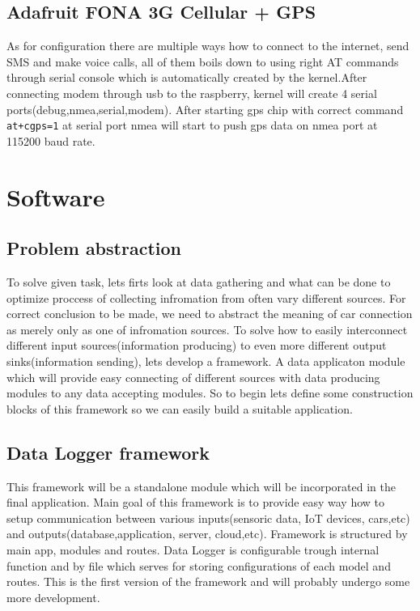 \subsection{Adafruit FONA 3G Cellular + GPS} %
\label{sub:adafruit_fona_3g_cellular_gps_}
 As for configuration there are multiple ways how to connect to the internet, send SMS and make voice calls, all of them boils down to using right AT commands through serial console which is automatically created by the kernel.After connecting modem through usb to the raspberry, kernel will create 4 serial ports(debug,nmea,serial,modem). After starting gps chip with correct command \verb|at+cgps=1| at serial port nmea will start to push gps data on nmea port at 115200 baud rate.
\newpage
\section{Software} %
\label{sec:software}
\subsection{Problem abstraction} %
\label{sub:problem_abstraction}
To solve given task, lets firts look at data gathering and what can be done to optimize proccess of collecting infromation from often vary different sources. For correct conclusion to be made, we need to abstract the meaning of car connection as merely only as one of infromation sources. To solve how to easily interconnect different input sources(information producing) to even more different output sinks(information sending), lets develop a framework. A data applicaton module which will provide easy connecting of different sources with data producing modules to any data accepting modules. So to begin lets define some construction blocks of this framework so we can easily build a suitable application.
\subsection{Data Logger framework} %
This framework will be a standalone module which will be incorporated in the final application. Main goal of this framework is to provide easy way how to setup communication between various inputs(sensoric data, IoT devices, cars,etc) and outputs(database,application, server, cloud,etc). Framework is structured by main app, modules and routes. Data Logger is configurable trough internal function and by file which serves for storing configurations of each model and routes. This is the first version of the framework and will probably undergo some more development.
